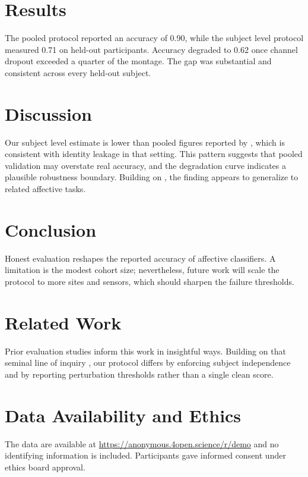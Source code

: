 \documentclass{article}
\begin{document}
\section{Results}
\label{sec:results}
The pooled protocol reported an accuracy of 0.90, while the subject level
protocol measured 0.71 on held-out participants. Accuracy degraded to 0.62 once
channel dropout exceeded a quarter of the montage. The gap was substantial and
consistent across every held-out subject.

\section{Discussion}
Our subject level estimate is lower than pooled figures reported by
\cite{koelstra2023}, which is consistent with identity leakage in that setting.
This pattern suggests that pooled validation may overstate real accuracy, and the
degradation curve indicates a plausible robustness boundary. Building on
\cite{gross2024}, the finding appears to generalize to related affective tasks.

\section{Conclusion}
Honest evaluation reshapes the reported accuracy of affective classifiers. A
limitation is the modest cohort size; nevertheless, future work will scale the
protocol to more sites and sensors, which should sharpen the failure thresholds.

\section{Related Work}
Prior evaluation studies inform this work in insightful ways. Building on that
seminal line of inquiry \cite{lecun2021, vaswani2022}, our protocol differs by
enforcing subject independence and by reporting perturbation thresholds rather
than a single clean score.

\section{Data Availability and Ethics}
The data are available at \url{https://anonymous.4open.science/r/demo} and no
identifying information is included. Participants gave informed consent under
ethics board approval.

\end{document}

